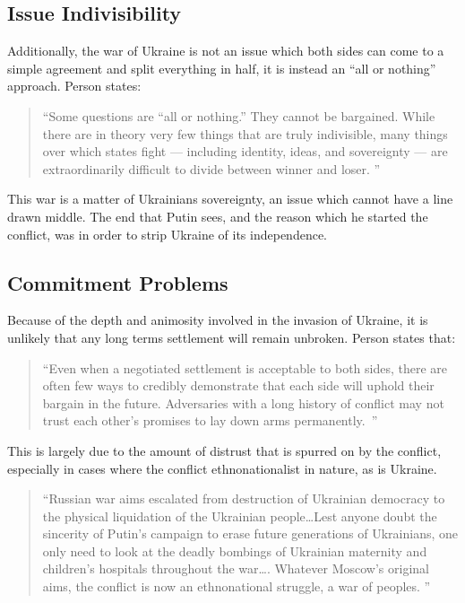 \documentclass{article}
\begin{document}
    \subsection{Issue Indivisibility}

        Additionally, the war of Ukraine is not an issue which both sides can come to a simple agreement and split everything in half, it is instead an ``all or nothing'' approach. Person states:
        
        \begin{quote}
            ``Some questions are “all or nothing.” They cannot be bargained. While there are in theory very few things that are truly indivisible, many things over which states fight — including identity, ideas, and sovereignty — are extraordinarily difficult to divide between winner and loser. \cite{person_2025}''
        \end{quote}
        
        This war is a matter of Ukrainians sovereignty, an issue which cannot have a line drawn middle. The end that Putin sees, and the reason which he started the conflict, was in order to strip Ukraine of its independence. 

    \subsection{Commitment Problems}

        Because of the depth and animosity involved in the invasion of Ukraine, it is unlikely that any long terms settlement will remain unbroken. Person states that:
        \begin{quote}
            ``Even when a negotiated settlement is acceptable to both sides, there are often few ways to credibly demonstrate that each side will uphold their bargain in the future. Adversaries with a long history of conflict may not trust each other’s promises to lay down arms permanently.~\cite{person_2025}''
        \end{quote}

        This is largely due to the amount of distrust that is spurred on by the conflict, especially in cases where the conflict ethnonationalist in nature, as is Ukraine. 

        \begin{quote}
           ``Russian war aims escalated from destruction of Ukrainian democracy to the physical liquidation of the Ukrainian people\ldots Lest anyone doubt the sincerity of Putin’s campaign to erase future generations of Ukrainians, one only need to look at the deadly bombings of Ukrainian maternity and children’s hospitals throughout the war\ldots. Whatever Moscow’s original aims, the conflict is now an ethnonational struggle, a war of peoples. ''
        \end{quote}
\end{document}
